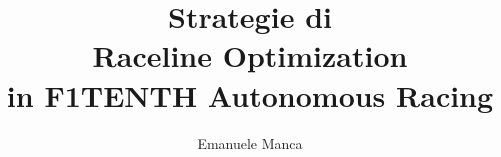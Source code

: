 \documentclass[12pt,a4paper]{report}
\title{Strategie di\\Raceline Optimization\\in F1TENTH Autonomous Racing}
\author{Emanuele Manca}
\begin{document}
\makefrontpage
\afterpreface
\newpage








\printbibliography
\end{document}
